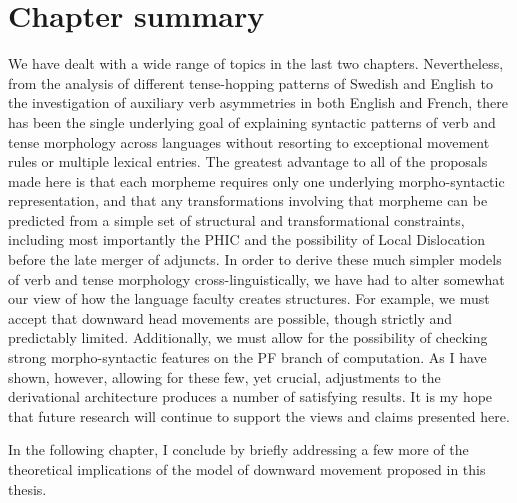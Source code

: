 \section{Chapter summary}
We have dealt with a wide range of topics in the last two chapters. Nevertheless, from the analysis of different tense-hopping patterns of Swedish and English to the investigation of auxiliary verb asymmetries in both English and French, there has been the single underlying goal of explaining syntactic patterns of verb and tense morphology across languages without resorting to exceptional movement rules or multiple lexical entries. The greatest advantage to all of the proposals made here is that each morpheme requires only one underlying morpho-syntactic representation, and that any transformations involving that morpheme can be predicted from a simple set of structural and transformational constraints, including most importantly the PHIC and the possibility of Local Dislocation before the late merger of adjuncts. In order to derive these much simpler models of verb and tense morphology cross-linguistically, we have had to alter somewhat our view of how the language faculty creates structures. For example, we must accept that downward head movements are possible, though strictly and predictably limited. Additionally, we must allow for the possibility of checking strong morpho-syntactic features on the PF branch of computation. As I have shown, however, allowing for these few, yet crucial, adjustments to the derivational architecture produces a number of satisfying results. It is my hope that future research will continue to support the views and claims presented here.

In the following chapter, I conclude by briefly addressing a few more of the theoretical implications of the model of downward movement proposed in this thesis.



